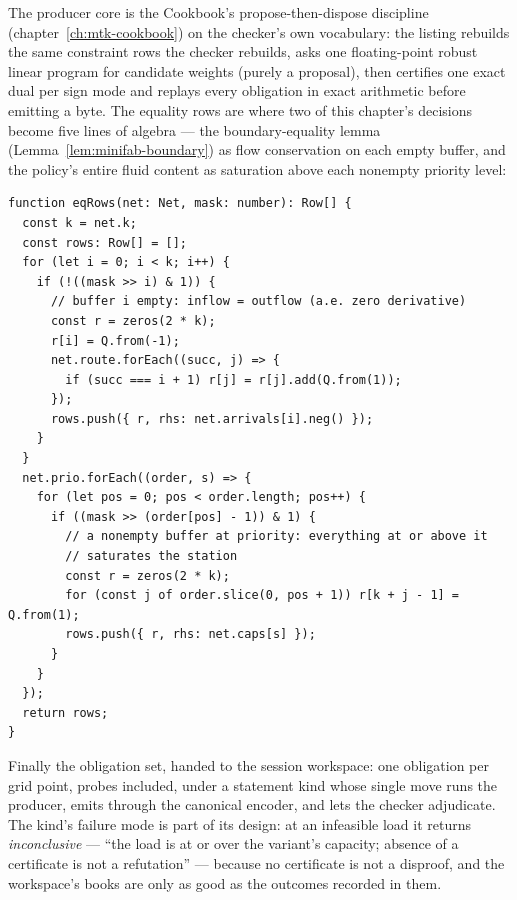 The producer core is the Cookbook's propose-then-dispose discipline
(chapter~\ref{ch:mtk-cookbook}) on the checker's own vocabulary: the
listing rebuilds the same constraint rows the checker rebuilds, asks
one floating-point robust linear program for candidate weights
(purely a proposal), then certifies one exact dual per sign mode and
replays every obligation in exact arithmetic before emitting a byte.
The equality rows are where two of this chapter's decisions become
five lines of algebra --- the boundary-equality lemma
(Lemma~\ref{lem:minifab-boundary}) as flow conservation on each
empty buffer, and the policy's entire fluid content as saturation
above each nonempty priority level:

\begin{Verbatim}[fontsize=\small,frame=leftline,rulecolor=\color{accentmid},framesep=3mm,xleftmargin=3mm]
function eqRows(net: Net, mask: number): Row[] {
  const k = net.k;
  const rows: Row[] = [];
  for (let i = 0; i < k; i++) {
    if (!((mask >> i) & 1)) {
      // buffer i empty: inflow = outflow (a.e. zero derivative)
      const r = zeros(2 * k);
      r[i] = Q.from(-1);
      net.route.forEach((succ, j) => {
        if (succ === i + 1) r[j] = r[j].add(Q.from(1));
      });
      rows.push({ r, rhs: net.arrivals[i].neg() });
    }
  }
  net.prio.forEach((order, s) => {
    for (let pos = 0; pos < order.length; pos++) {
      if ((mask >> (order[pos] - 1)) & 1) {
        // a nonempty buffer at priority: everything at or above it
        // saturates the station
        const r = zeros(2 * k);
        for (const j of order.slice(0, pos + 1)) r[k + j - 1] = Q.from(1);
        rows.push({ r, rhs: net.caps[s] });
      }
    }
  });
  return rows;
}
\end{Verbatim}

Finally the obligation set, handed to the session workspace: one
obligation per grid point, probes included, under a statement kind
whose single move runs the producer, emits through the canonical
encoder, and lets the checker adjudicate. The kind's failure mode is
part of its design: at an infeasible load it returns
\emph{inconclusive} --- ``the load is at or over the variant's
capacity; absence of a certificate is not a refutation'' --- because
no certificate is not a disproof, and the workspace's books are only
as good as the outcomes recorded in them.

